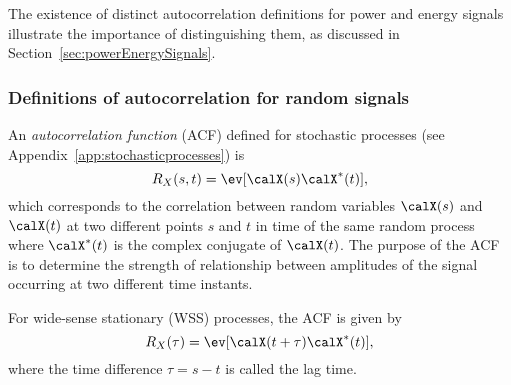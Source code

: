 The existence of distinct autocorrelation definitions for power and energy signals 
illustrate the importance of distinguishing them, as discussed in Section~\ref{sec:powerEnergySignals}.

\subsubsection{{\akadvanced} Definitions of autocorrelation for random signals}

An \emph{autocorrelation function} (ACF) defined for stochastic processes (see Appendix~\ref{app:stochasticprocesses}) is
\begin{equation}
R_{X}(s,t) = \ev[\calX(s) \calX^*(t)],
	\label{eq:autocorrelation}
\end{equation}
which corresponds to the correlation between random variables $\calX(s)$ and $\calX(t)$ at two different points $s$ and $t$ in time of the same random process where $\calX^*(t)$ is the complex conjugate of $\calX(t)$.
The purpose of the ACF is to determine the strength of relationship between amplitudes of the signal occurring at two different time instants.

For wide-sense stationary (WSS) processes, the ACF is given by
\begin{equation}
R_{X}(\tau) = \ev[\calX(t+\tau) \calX^*(t)],
\label{eq:wss_autocorrelation}
\end{equation}
where the time difference $\tau=s-t$ is called the lag time. 



